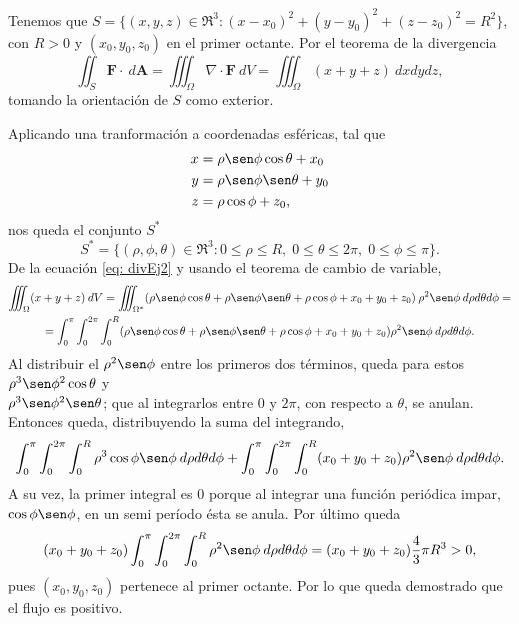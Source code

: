 \begin{solution}
    Tenemos que $S=\{(x,y,z)\in\Re^3: (x-x_0)^2+(y-y_0)^2+(z-z_0)^2=R^2\}$, con $R>0$ y $(x_0,y_0,z_0)$ en el primer octante.
    Por el teorema de la divergencia
    \begin{equation}
        \iint_S \mathbf{F}\cdot\:d\mathbf{A} = \iiint_\Omega \nabla\cdot\mathbf{F}\:dV
        = \iiint_\Omega (x+y+z)\:dxdydz, \label{eq: divEj2}
    \end{equation}
    tomando la orientaci\'on de $S$ como exterior.

    Aplicando una tranformaci\'on a coordenadas esf\'ericas, tal que
    \begin{align*}
        x & =\rho\sen\phi\cos\theta+x_0 \\
        y & =\rho\sen\phi\sen\theta+y_0 \\
        z & =\rho\cos\phi+z_0,
    \end{align*}
    nos queda el conjunto $S^*$
    \[
        S^*=\{(\rho,\phi,\theta)\in\Re^3:0\leq\rho\leq R,\;0\leq\theta\leq2\pi,\;0\leq\phi\leq\pi\}.
    \]
    De la ecuaci\'on \ref{eq: divEj2} y usando   el teorema de cambio de variable,
    \begin{gather*}
        \iiint_\Omega (x+y+z) \:dV = \iiint_{\Omega^*}    (\rho\sen\phi\cos\theta + \rho\sen\phi\sen\theta + \rho\cos\phi + x_0 + y_0 + z_0)     \:\rho^2\sen\phi\:d\rho d\theta d\phi=\\
        = \int_0^\pi\int_0^{2\pi}\int_0^R (\rho\sen\phi\cos\theta + \rho\sen\phi\sen\theta + \rho\cos\phi + x_0 + y_0 + z_0)\rho^2\sen\phi\:d\rho d\theta d\phi.
    \end{gather*}
    Al distribuir el $\rho^2\sen\phi$ entre los primeros dos t\'erminos, queda para estos \(\rho^3\sen\phi^2\cos\theta\) y \\
    \(\rho^3\sen\phi^2\sen\theta\); que al integrarlos entre 0 y $2\pi$, con respecto a $\theta$, se anulan. Entonces queda, distribuyendo la suma del integrando,
    \[
        \int_0^\pi\int_0^{2\pi}\int_0^R \rho^3\cos\phi\sen\phi\:d\rho d\theta d\phi + \int_0^\pi\int_0^{2\pi}\int_0^R (x_0 + y_0 + z_0)\rho^2\sen\phi\:d\rho d\theta d\phi.
    \]
    A su vez, la primer integral es 0 porque al integrar una funci\'on peri\'odica impar, $\cos\phi\sen\phi$, en un semi per\'iodo \'esta se anula.
    Por \'ultimo queda
    \[
        (x_0 + y_0 + z_0)\int_0^\pi\int_0^{2\pi}\int_0^R \rho^2\sen\phi\:d\rho d\theta d\phi = (x_0 + y_0 + z_0)\frac{4}{3}\pi R^3 > 0,
    \]
    pues $(x_0, y_0, z_0)$ pertenece al primer octante. Por lo que queda demostrado que el flujo es positivo. %
\end{solution}


